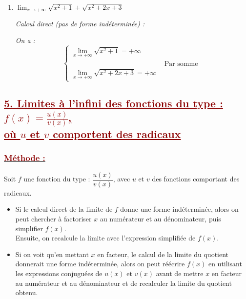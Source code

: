 \documentclass[12pt,a4paper]{article}
\begin{document}
\begin{enumerate}
    \vspace{0.2cm}
    
     

    \vspace{0.6cm}

    \item 
    $
    \displaystyle \lim_{x \to +\infty} \sqrt{x^2 + 1} + \sqrt{x^2 + 2x + 3}
    $

    \textit{Calcul direct (pas de forme indéterminée) :}
    
    \textit{On a :}
    \[
    \begin{cases}
    \displaystyle \lim_{x \to +\infty} \sqrt{x^2 + 1} = +\infty \\[3mm]
    &\text{ Par somme }\\
    \displaystyle \lim_{x \to +\infty} \sqrt{x^2 + 2x + 3} = +\infty
    \end{cases}
    \]
    
    \vspace{0.2cm}
    
     
\end{enumerate}

\subsection*{\textcolor{darkred}{\underline{5. Limites à l'infini des fonctions du type : $f(x) = \frac{u(x)}{v(x)}$,} \\[0.15cm] \underline{où $u$ et $v$ comportent des radicaux}}}

\subsubsection*{\underline{\textcolor{darkred}{ Méthode : }}}

Soit $f$ une fonction du type : $\dfrac{u(x)}{v(x)}$, avec $u$ et $v$ des fonctions comportant des radicaux.
\begin{itemize}
    \item Si le calcul direct de la limite de $f$ donne une forme indéterminée, alors on peut chercher à factoriser $x$ au numérateur et au dénominateur, puis simplifier $f(x)$.\\
    Ensuite, on recalcule la limite avec l'expression simplifiée de $f(x)$.
    \item Si on voit qu'en mettant $x$ en facteur, le calcul de la limite du quotient donnerait une forme indéterminée, alors on peut réécrire $f(x)$ en utilisant les expressions conjuguées de $u(x)$ et $v(x)$ avant de mettre $x$ en facteur au numérateur et au dénominateur et de recalculer la limite du quotient obtenu.
\end{itemize}
\end{document}
